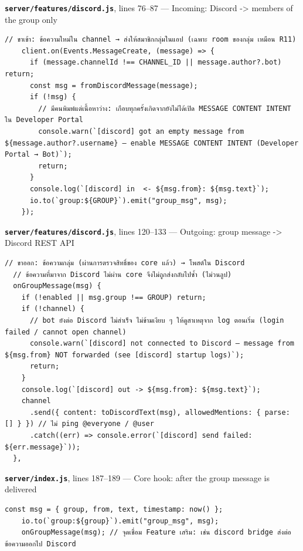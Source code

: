 \documentclass[11pt,a4paper]{article}
\newcommand{\code}[1]{\texttt{#1}}
\newcommand{\snap}[3]{\par\medskip\textbf{\code{#1}}, lines #2 --- #3}
\begin{document}
\snap{server/features/discord.js}{76--87}{Incoming: Discord -> members of the group only}
\begin{Verbatim}[firstnumber=76]
    // ขาเข้า: ข้อความใหม่ใน channel → ส่งให้สมาชิกกลุ่มในแอป (เฉพาะ room ของกลุ่ม เหมือน R11)
    client.on(Events.MessageCreate, (message) => {
      if (message.channelId !== CHANNEL_ID || message.author?.bot) return;
      const msg = fromDiscordMessage(message);
      if (!msg) {
        // มีคนพิมพ์แต่เนื้อหาว่าง: เกือบทุกครั้งเกิดจากยังไม่ได้เปิด MESSAGE CONTENT INTENT ใน Developer Portal
        console.warn(`[discord] got an empty message from ${message.author?.username} — enable MESSAGE CONTENT INTENT (Developer Portal → Bot)`);
        return;
      }
      console.log(`[discord] in  <- ${msg.from}: ${msg.text}`);
      io.to(`group:${GROUP}`).emit("group_msg", msg);
    });
\end{Verbatim}

\snap{server/features/discord.js}{120--133}{Outgoing: group message -> Discord REST API}
\begin{Verbatim}[firstnumber=120]
  // ขาออก: ข้อความกลุ่ม (ผ่านการตรวจสิทธิ์ของ core แล้ว) → โพสต์ใน Discord
  // ข้อความที่มาจาก Discord ไม่ผ่าน core จึงไม่ถูกส่งกลับไปซ้ำ (ไม่วนลูป)
  onGroupMessage(msg) {
    if (!enabled || msg.group !== GROUP) return;
    if (!channel) {
      // bot ยังต่อ Discord ไม่สำเร็จ ไม่ข้ามเงียบ ๆ ให้ดูสาเหตุจาก log ตอนเริ่ม (login failed / cannot open channel)
      console.warn(`[discord] not connected to Discord — message from ${msg.from} NOT forwarded (see [discord] startup logs)`);
      return;
    }
    console.log(`[discord] out -> ${msg.from}: ${msg.text}`);
    channel
      .send({ content: toDiscordText(msg), allowedMentions: { parse: [] } }) // ไม่ ping @everyone / @user
      .catch((err) => console.error(`[discord] send failed: ${err.message}`));
  },
\end{Verbatim}

\snap{server/index.js}{187--189}{Core hook: after the group message is delivered}
\begin{Verbatim}[firstnumber=187]
    const msg = { group, from, text, timestamp: now() };
    io.to(`group:${group}`).emit("group_msg", msg);
    onGroupMessage(msg); // จุดเชื่อม Feature เสริม: เช่น discord bridge ส่งต่อข้อความออกไป Discord
\end{Verbatim}
\end{document}
